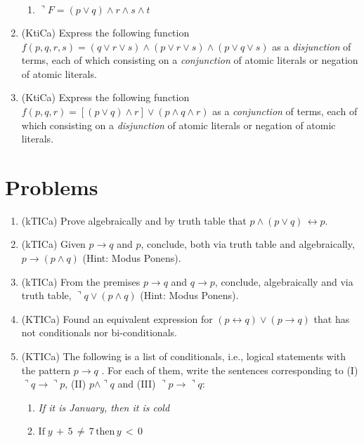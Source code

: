 \documentclass{article}
\begin{document}
\begin{enumerate}
\begin{enumerate}
\item $\urcorner F = \left(p\vee q\right)\wedge r\wedge s\wedge t$
\end{enumerate}
\item (KtiCa) Express the following function $f(p,q,r,s)=(q\vee r\vee s)\wedge (p\vee r \vee s)\wedge (p\vee q\vee s)$ as a {\sl disjunction} of terms,
each of which consisting on a {\sl conjunction} of atomic literals or negation of atomic literals.
\item (KtiCa) Express the following function $f(p,q,r)=\left[ (p\vee q)\wedge r\right]\vee (p\wedge q \wedge r)$ as a {\sl conjunction} of terms,
each of which consisting on a {\sl disjunction} of atomic literals or negation of atomic literals.
\end{enumerate}
\section{Problems}
\begin{enumerate}
\item (kTICa) Prove algebraically and by truth table that $p\wedge (p\vee q)\,\leftrightarrow p$.
\item (kTICa) Given $p\rightarrow q$ and $p$, conclude, both via truth table and algebraically, $p\rightarrow (p\wedge q)$ (Hint: Modus Ponens).
\item (kTICa) From the premises $p\rightarrow q$ and $q\rightarrow p$, conclude, algebraically and via truth table, $\urcorner q\vee (p\wedge q)$ (Hint: Modus Ponens).
\item (KTICa) Found an equivalent expression for $(p\leftrightarrow q)\vee (p\rightarrow q)$ that has not conditionals nor bi-conditionals.
\item (KTICa) The following is a list of conditionals, i.e., logical statements with the pattern $p\rightarrow q$ . For each of them, write the sentences corresponding to
(I) $\urcorner q \rightarrow \urcorner p$, (II) $p\wedge \urcorner q$ and  (III) $\urcorner p \rightarrow \urcorner q$:
\begin{enumerate}
\item {\sl If it is January, then it is cold}
\item $\mbox{If}\;y\,+\,5\,\neq\,7\,\mbox{then}\,y\,<\,0$
\end{enumerate}
\end{enumerate}
\end{document}
